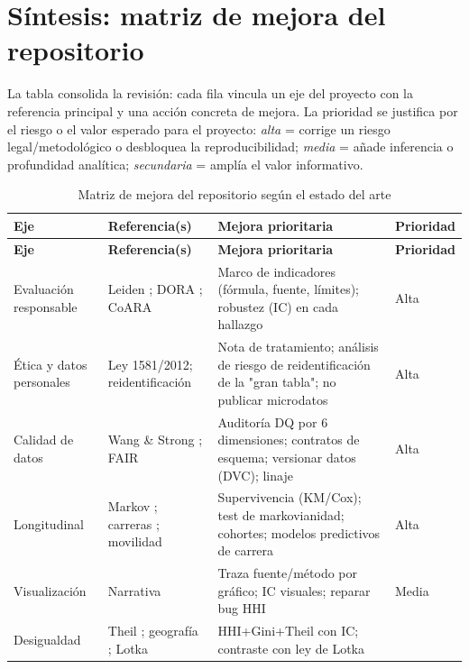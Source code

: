 \section{Síntesis: matriz de mejora del repositorio}

La tabla consolida la revisión: cada fila vincula un eje del proyecto con la
referencia principal y una acción concreta de mejora. La prioridad se justifica
por el riesgo o el valor esperado para el proyecto: \emph{alta} = corrige un
riesgo legal/metodológico o desbloquea la reproducibilidad; \emph{media} =
añade inferencia o profundidad analítica; \emph{secundaria} = amplía el valor
informativo.

\begin{longtable}{p{3.1cm}p{3.4cm}p{4.4cm}p{2.3cm}}
\caption{Matriz de mejora del repositorio según el estado del arte}
\label{tab:matriz}\\
\toprule
\textbf{Eje} & \textbf{Referencia(s)} & \textbf{Mejora prioritaria} & \textbf{Prioridad} \\
\midrule
\endfirsthead
\toprule
\textbf{Eje} & \textbf{Referencia(s)} & \textbf{Mejora prioritaria} & \textbf{Prioridad} \\
\midrule
\endhead
Evaluación responsable & Leiden \cite{hicks2015leiden}; DORA \cite{dora2012}; CoARA \cite{coara2022} &
Marco de indicadores (fórmula, fuente, límites); robustez (IC) en cada hallazgo &
Alta \\
Ética y datos personales & Ley 1581/2012; reidentificación \cite{rocher2019estimating} &
Nota de tratamiento; análisis de riesgo de reidentificación de la "gran tabla"; no publicar microdatos &
Alta \\
Calidad de datos & Wang \& Strong \cite{wang1996beyond}; FAIR \cite{wilkinson2016fair} &
Auditoría DQ por 6 dimensiones; contratos de esquema; versionar datos (DVC); linaje &
Alta \\
Longitudinal & Markov \cite{kemeny1976finite}; carreras \cite{sinatra2016quantifying}; movilidad \cite{sugimoto2017scientists} &
Supervivencia (KM/Cox); test de markovianidad; cohortes; modelos predictivos de carrera &
Alta \\
Visualización & Narrativa \cite{segel2010narrative} &
Traza fuente/método por gráfico; IC visuales; reparar bug HHI &
Media \\
Desigualdad & Theil \cite{theil1967economics}; geografía \cite{frenken2009spatial}; Lotka \cite{lotka1926frequency} &
HHI+Gini+Theil con IC; contraste con ley de Lotka &

\end{longtable}
